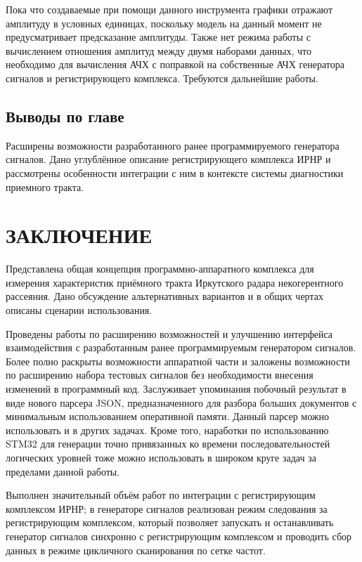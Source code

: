 \documentclass{report}
\begin{document}

Пока что создаваемые при помощи данного инструмента графики отражают амплитуду в условных единицах, поскольку модель на данный момент не предусматривает предсказание амплитуды. Также нет режима работы с вычислением отношения амплитуд между двумя наборами данных, что необходимо для вычисления АЧХ с поправкой на собственные АЧХ генератора сигналов и регистрирующего комплекса. Требуются дальнейшие работы.

\section*{Выводы по главе}
Расширены возможности разработанного ранее программируемого генератора сигналов. Дано углублённое описание регистрирующего комплекса ИРНР и рассмотрены особенности интеграции с ним в контексте системы диагностики приемного тракта.

\chapter*{ЗАКЛЮЧЕНИЕ}

Представлена общая концепция программно-аппаратного комплекса для измерения характеристик приёмного тракта Иркутского радара некогерентного рассеяния. Дано обсуждение альтернативных вариантов и в общих чертах описаны сценарии использования.

Проведены работы по расширению возможностей и улучшению интерфейса взаимодействия с разработанным ранее программируемым генератором сигналов. Более полно раскрыты возможности аппаратной части и заложены возможности по расширению набора тестовых сигналов без необходимости внесения изменений в программный код. Заслуживает упоминания побочный результат в виде нового парсера JSON, предназначенного для разбора больших документов с минимальным использованием оперативной памяти. Данный парсер можно использовать и в других задачах. Кроме того, наработки по использованию STM32 для генерации точно привязанных ко времени последовательностей логических уровней тоже можно использовать в широком круге задач за пределами данной работы.

Выполнен значительный объём работ по интеграции с регистрирующим комплексом ИРНР; в генераторе сигналов реализован режим следования за регистрирующим комплексом, который позволяет запускать и останавливать генератор сигналов синхронно с регистрирующим комплексом и проводить сбор данных в режиме цикличного сканирования по сетке частот.
\end{document}
